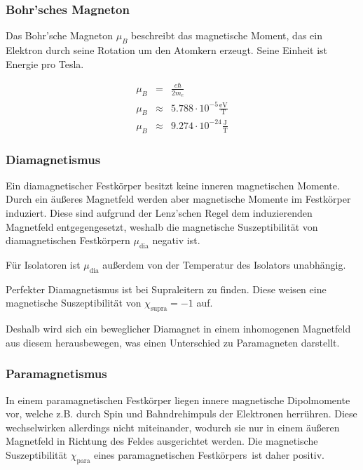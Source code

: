 \documentclass[12pt,a4paper]{scrartcl}
\numberwithin{equation}{section} %
\newcommand{\pu}[1]{\ensuremath{\mathrm{#1}}}
\renewcommand{\[}{} %
\renewcommand{\]}{\noindent} %
\begin{document}
\hypertarget{bohrsches-magneton}{%
\subsubsection{Bohr'sches Magneton}\label{bohrsches-magneton}}

Das Bohr'sche Magneton \(\mu_B\) beschreibt das magnetische Moment, das
ein Elektron durch seine Rotation um den Atomkern erzeugt. Seine Einheit
ist Energie pro Tesla.

\[
\begin{eqnarray}
    \mu_B &=& \frac{e\hbar}{2m_e} \\
    \mu_B &\approx& \pu{5.788 \cdot 10^{-5} \frac{eV}{T}} \\
    \mu_B &\approx& \pu{9.274 \cdot 10^{-24} \frac{J}{T}}
\end{eqnarray}
\]

\hypertarget{diamagnetismus}{%
\subsubsection{Diamagnetismus}\label{diamagnetismus}}

Ein diamagnetischer Festkörper besitzt keine inneren magnetischen
Momente. Durch ein äußeres Magnetfeld werden aber magnetische Momente im
Festkörper induziert. Diese sind aufgrund der Lenz'schen Regel dem
induzierenden Magnetfeld entgegengesetzt, weshalb die magnetische
Suszeptibilität von diamagnetischen Festkörpern \(\mu_\mathrm{dia}\)
negativ ist.

Für Isolatoren ist \(\mu_\mathrm{dia}\) außerdem von der Temperatur des
Isolators unabhängig.

Perfekter Diamagnetismus ist bei Supraleitern zu finden. Diese weisen
eine magnetische Suszeptibilität von \(\chi_\mathrm{supra} = -1\) auf.

Deshalb wird sich ein beweglicher Diamagnet in einem inhomogenen
Magnetfeld aus diesem herausbewegen, was einen Unterschied zu
Paramagneten darstellt.

\hypertarget{paramagnetismus}{%
\subsubsection{Paramagnetismus}\label{paramagnetismus}}

In einem paramagnetischen Festkörper liegen innere magnetische
Dipolmomente vor, welche z.B. durch Spin und Bahndrehimpuls der
Elektronen herrühren. Diese wechselwirken allerdings nicht miteinander,
wodurch sie nur in einem äußeren Magnetfeld in Richtung des Feldes
ausgerichtet werden. Die magnetische Suszeptibilität
\(\chi_\mathrm{para}\) eines paramagnetischen Festkörpers~ist daher
positiv.
\end{document}
